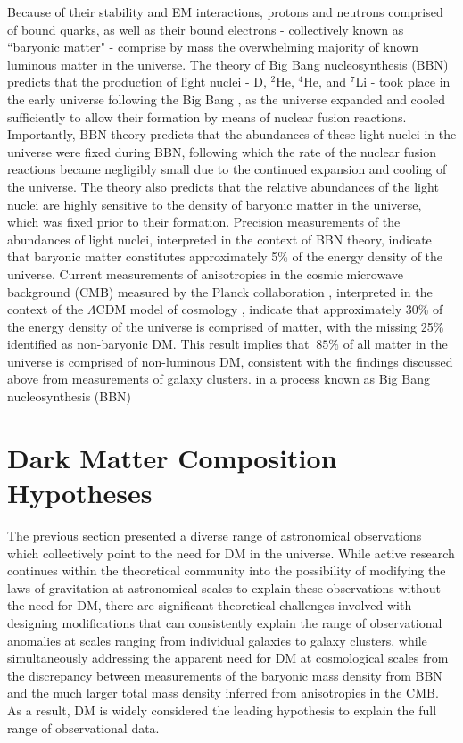 Because of their stability and EM interactions, protons and neutrons comprised of bound quarks, as well as their bound electrons - collectively known as ``baryonic matter" - comprise by mass the overwhelming majority of known luminous matter in the universe. The theory of Big Bang nucleosynthesis (BBN) \cite{pdg_2018} predicts that the production of light nuclei - D, \(^2\)He, \(^4\)He, and \(^7\)Li - took place in the early universe following the Big Bang \cite{uzan2016bigbang}, as the universe expanded and cooled sufficiently to allow their formation by means of nuclear fusion reactions. Importantly, BBN theory predicts that the abundances of these light nuclei in the universe were fixed during BBN, following which the rate of the nuclear fusion reactions became negligibly small due to the continued expansion and cooling of the universe. The theory also predicts that the relative abundances of the light nuclei are highly sensitive to the density of baryonic matter in the universe, which was fixed prior to their formation. Precision measurements of the abundances of light nuclei, interpreted in the context of BBN theory, indicate that baryonic matter constitutes approximately 5\% \cite{pdg_2018} of the energy density of the universe. Current measurements of anisotropies in the cosmic microwave background (CMB) \cite{cmb_1965} measured by the Planck collaboration \cite{Planck_2020}, interpreted in the context of the \(\Lambda\)CDM model of cosmology \cite{pdg_2018}, indicate that approximately 30\% of the energy density of the universe is comprised of matter, with the missing 25\% identified as non-baryonic DM. This result implies that \(~85\%\) of all matter in the universe is comprised of non-luminous DM, consistent with the findings discussed above from measurements of galaxy clusters.
in a process known as Big Bang nucleosynthesis (BBN)

\section{Dark Matter Composition Hypotheses}

The previous section presented a diverse range of astronomical observations which collectively point to the need for DM in the universe. While active research continues within the theoretical community \cite{mond_2012, mond_2021} into the possibility of modifying the laws of gravitation at astronomical scales to explain these observations without the need for DM, there are significant theoretical challenges involved with designing modifications that can consistently explain the range of observational anomalies at scales ranging from individual galaxies to galaxy clusters, while simultaneously addressing the apparent need for DM at cosmological scales from the discrepancy between measurements of the baryonic mass density from BBN and the much larger total mass density inferred from anisotropies in the CMB. As a result, DM is widely considered the leading hypothesis to explain the full range of observational data.


